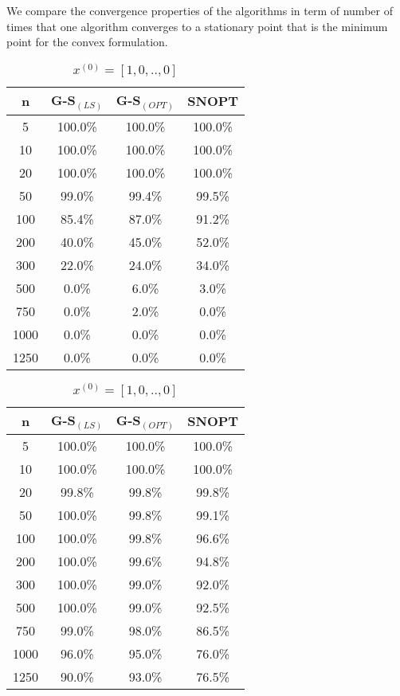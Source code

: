 We compare the convergence properties of the algorithms in term of number of times that one algorithm converges to a stationary point that is the minimum point for the convex formulation.

\begin{table}
\begin{minipage}{.4\linewidth}
\centering
\begin{tabular}{ c | c | c | c }
n &  G-S$_{(LS)}$ & G-S$_{(OPT)}$  & SNOPT \\\hline
5    & 100.0\% & 100.0\% & 100.0\%\\\hline
10   & 100.0\% & 100.0\% & 100.0\%\\\hline
20   & 100.0\% & 100.0\% & 100.0\%\\\hline
50   & 99.0\%  & 99.4\%  & 99.5\%\\\hline
100  & 85.4\%  & 87.0\%  & 91.2\%\\\hline
200  & 40.0\%  & 45.0\%  & 52.0\%\\\hline
300  & 22.0\%  & 24.0\%  & 34.0\%\\\hline
500  & 0.0\%   & 6.0\%   & 3.0\%\\\hline
750  & 0.0\%   & 2.0\%   & 0.0\%\\\hline
1000 & 0.0\%   & 0.0\%   & 0.0\%\\\hline
1250 & 0.0\%   & 0.0\%   & 0.0\%\\\hline
\end{tabular}
\caption{$x^{(0)}_i = \frac{1}{n} \quad \forall i$}
\end{minipage}
\hfill
\begin{minipage}{.4\linewidth}
\centering
\begin{tabular}{ c | c| c | c}
n &  G-S$_{(LS)}$ & G-S$_{(OPT)}$  & SNOPT \\\hline
5    & 100.0\%  & 100.0\% & 100.0\%\\\hline
10   & 100.0\%  & 100.0\% & 100.0\%\\\hline
20   & 99.8\%   & 99.8\%  & 99.8\%\\\hline
50   & 100.0\%  & 99.8\%  & 99.1\%\\\hline
100  & 100.0\%  & 99.8\%  & 96.6\% \\\hline
200  & 100.0\%  & 99.6\%  & 94.8\% \\\hline
300  & 100.0\%  & 99.0\%  & 92.0\% \\\hline
500  & 100.0\%  & 99.0\%  & 92.5\%\\\hline
750  & 99.0\%   & 98.0\%  & 86.5\%\\\hline
1000 & 96.0\%   & 95.0\%  & 76.0\%\\\hline
1250 & 90.0\%   & 93.0\%  & 76.5\%\\\hline
\end{tabular}
\caption{$x^{(0)}= [1, 0, .., 0]$}
\end{minipage}
\end{table}

